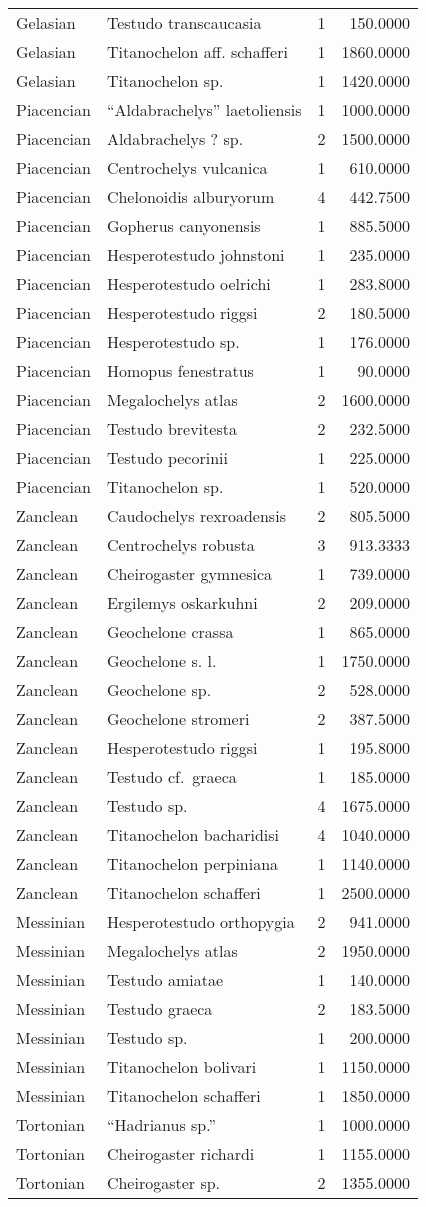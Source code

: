 \begin{longtable}[]{@{}llrr@{}}
	Gelasian & Testudo transcaucasia & 1 & 150.0000\tabularnewline
	Gelasian & Titanochelon aff. schafferi & 1 & 1860.0000\tabularnewline
	Gelasian & Titanochelon sp. & 1 & 1420.0000\tabularnewline
	Piacencian & ``Aldabrachelys'' laetoliensis & 1 &
	1000.0000\tabularnewline
	Piacencian & Aldabrachelys ? sp. & 2 & 1500.0000\tabularnewline
	Piacencian & Centrochelys vulcanica & 1 & 610.0000\tabularnewline
	Piacencian & Chelonoidis alburyorum & 4 & 442.7500\tabularnewline
	Piacencian & Gopherus canyonensis & 1 & 885.5000\tabularnewline
	Piacencian & Hesperotestudo johnstoni & 1 & 235.0000\tabularnewline
	Piacencian & Hesperotestudo oelrichi & 1 & 283.8000\tabularnewline
	Piacencian & Hesperotestudo riggsi & 2 & 180.5000\tabularnewline
	Piacencian & Hesperotestudo sp. & 1 & 176.0000\tabularnewline
	Piacencian & Homopus fenestratus & 1 & 90.0000\tabularnewline
	Piacencian & Megalochelys atlas & 2 & 1600.0000\tabularnewline
	Piacencian & Testudo brevitesta & 2 & 232.5000\tabularnewline
	Piacencian & Testudo pecorinii & 1 & 225.0000\tabularnewline
	Piacencian & Titanochelon sp. & 1 & 520.0000\tabularnewline
	Zanclean & Caudochelys rexroadensis & 2 & 805.5000\tabularnewline
	Zanclean & Centrochelys robusta & 3 & 913.3333\tabularnewline
	Zanclean & Cheirogaster gymnesica & 1 & 739.0000\tabularnewline
	Zanclean & Ergilemys oskarkuhni & 2 & 209.0000\tabularnewline
	Zanclean & Geochelone crassa & 1 & 865.0000\tabularnewline
	Zanclean & Geochelone s. l. & 1 & 1750.0000\tabularnewline
	Zanclean & Geochelone sp. & 2 & 528.0000\tabularnewline
	Zanclean & Geochelone stromeri & 2 & 387.5000\tabularnewline
	Zanclean & Hesperotestudo riggsi & 1 & 195.8000\tabularnewline
	Zanclean & Testudo cf.~graeca & 1 & 185.0000\tabularnewline
	Zanclean & Testudo sp. & 4 & 1675.0000\tabularnewline
	Zanclean & Titanochelon bacharidisi & 4 & 1040.0000\tabularnewline
	Zanclean & Titanochelon perpiniana & 1 & 1140.0000\tabularnewline
	Zanclean & Titanochelon schafferi & 1 & 2500.0000\tabularnewline
	Messinian & Hesperotestudo orthopygia & 2 & 941.0000\tabularnewline
	Messinian & Megalochelys atlas & 2 & 1950.0000\tabularnewline
	Messinian & Testudo amiatae & 1 & 140.0000\tabularnewline
	Messinian & Testudo graeca & 2 & 183.5000\tabularnewline
	Messinian & Testudo sp. & 1 & 200.0000\tabularnewline
	Messinian & Titanochelon bolivari & 1 & 1150.0000\tabularnewline
	Messinian & Titanochelon schafferi & 1 & 1850.0000\tabularnewline
	Tortonian & ``Hadrianus sp.'' & 1 & 1000.0000\tabularnewline
	Tortonian & Cheirogaster richardi & 1 & 1155.0000\tabularnewline
	Tortonian & Cheirogaster sp. & 2 & 1355.0000\tabularnewline

\end{longtable}
